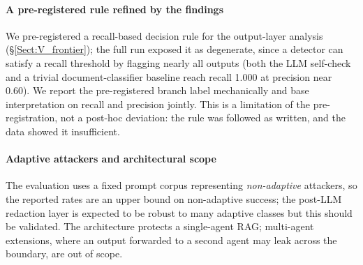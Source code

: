 \documentclass[journal]{IEEEtran}
\begin{document}
\paragraph{A pre-registered rule refined by the findings} We pre-registered a recall-based decision rule for the output-layer analysis (\S\ref{Sect:V_frontier}); the full run exposed it as degenerate, since a detector can satisfy a recall threshold by flagging nearly all outputs (both the LLM self-check and a trivial document-classifier baseline reach recall 1.000 at precision near 0.60). We report the pre-registered branch label mechanically and base interpretation on recall and precision jointly. This is a limitation of the pre-registration, not a post-hoc deviation: the rule was followed as written, and the data showed it insufficient.

\paragraph{Adaptive attackers and architectural scope} The evaluation uses a fixed prompt corpus representing \emph{non-adaptive} attackers, so the reported rates are an upper bound on non-adaptive success; the post-LLM redaction layer is expected to be robust to many adaptive classes but this should be validated. The architecture protects a single-agent RAG; multi-agent extensions, where an output forwarded to a second agent may leak across the boundary, are out of scope.
\end{document}

